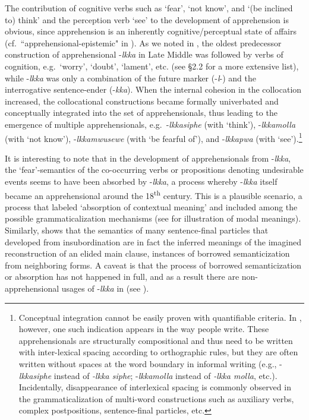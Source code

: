 \documentclass[output=paper,colorlinks,citecolor=brown]{langscibook}
\begin{document}
The contribution of cognitive verbs such as `fear', `not know', and `(be inclined to) think' and the perception verb `see' to the development of apprehension is obvious, since apprehension is an inherently cognitive/perceptual state of affairs (cf.\ ``apprehensional-epistemic" in \citet{lichtenberk1995}). As we noted in , the oldest predecessor construction of apprehensional \nobreakdash-\textit{lkka} in Late Middle  was followed by verbs of cognition, e.g.\  `worry', `doubt', `lament', etc. (see \textsf{§}2.2 for a more extensive list), while \nobreakdash-\textit{lkka} was only a combination of the future marker (-\textit{l}-) and the interrogative sentence-ender (-\textit{kka}). When the internal cohesion in the collocation increased, the collocational constructions became formally univerbated and conceptually integrated into the set of apprehensionals, thus leading to the emergence of multiple apprehensionals, e.g.\  \nobreakdash-\textit{lkkasiphe} (with `think'), \nobreakdash-\textit{lkkamolla} (with `not know'), \nobreakdash-\textit{lkkamwusewe} (with `be fearful of'), and \nobreakdash-\textit{lkkapwa} (with `see').\footnote{Conceptual integration cannot be easily proven with quantifiable criteria. In , however, one such indication appears in the way people write. These apprehensionals are structurally compositional and thus need to be written with inter-lexical spacing according to orthographic rules, but they are often written without spaces at the word boundary in informal writing (e.g., \nobreakdash-\textit{lkkasiphe} instead of \textit{-lkka siphe}; \nobreakdash-\textit{lkkamolla} instead of \textit{-lkka molla}, etc.). Incidentally, disappearance of interlexical spacing is commonly observed in the grammaticalization of multi-word constructions such as auxiliary verbs, complex postpositions, sentence-final particles, etc.}   

It is interesting to note that in the development of apprehensionals from \nobreakdash-\textit{lkka}, the `fear'-semantics of the co-occurring verbs or propositions denoting undesirable events seems to have been absorbed by \nobreakdash-\textit{lkka}, a process whereby \nobreakdash-\textit{lkka} itself became an apprehensional around the 18\textsuperscript{th} century. This is a plausible scenario, a process that \citet{bybeeetal1994} labeled `absorption of contextual meaning' and included among the possible grammaticalization mechanisms (see \citealt[230--236]{bybeeetal1994} for illustration of modal meanings). Similarly, \citet{Rhee2017} shows that the semantics of many sentence-final particles that developed from insubordination are in fact the inferred meanings of the imagined reconstruction of an elided main clause, instances of borrowed semanticization from neighboring forms. A caveat is that the process of borrowed semanticization or absorption has not happened in full, and as a result there are non-apprehensional usages of \nobreakdash-\textit{lkka} in  (see ). 
\end{document}
